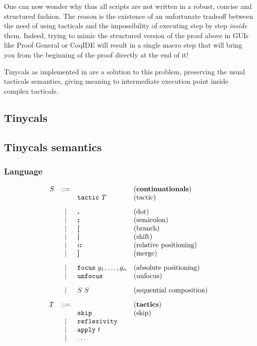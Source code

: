 
One can now wonder why thus all scripts are not written in a robust, concise and
structured fashion. The reason is the existence of an unfortunate tradeoff
between the need of using tacticals and the impossibility of executing step by
step \emph{inside} them. Indeed, trying to mimic the structured version of the
proof above in GUIs like Proof General or CoqIDE will result in a single macro
step that will bring you from the beginning of the proof directly at the end of
it!

Tinycals as implemented in \MATITA{} are a solution to this problem, preserving
the usual tacticals semantics, giving meaning to intermediate execution point
inside complex tacticals.

\subsection{Tinycals}

\subsection{Tinycals semantics}

\subsubsection{Language}

\[
\begin{array}{rcll}
 S & ::= & & \mbox{(\textbf{continuationals})}\\
   &     & \mathtt{tactic}~T & \mbox{(tactic)}\\[2ex]
   &  |  & \mbox{\textbf{.}} & \mbox{(dot)} \\
   &  |  & \mbox{\textbf{;}} & \mbox{(semicolon)} \\
   &  |  & \mbox{\textbf{[}} & \mbox{(branch)} \\
   &  |  & \mbox{\textbf{\textbar}} & \mbox{(shift)} \\
   &  |  & i\mbox{\textbf{:}} & \mbox{(relative positioning)} \\
   &  |  & \mbox{\textbf{]}} & \mbox{(merge)} \\[2ex]
   &  |  & \mathtt{focus}~g_1,\dots,g_n & \mbox{(absolute positioning)} \\
   &  |  & \mathtt{unfocus} & \mbox{(unfocus)} \\[2ex]
   &  |  & S ~ S & \mbox{(sequential composition)} \\[2ex]
   T & : := & & \mbox{(\textbf{tactics})}\\
     &   & \mathtt{skip} & \mbox{(skip)} \\
     & | & \mathtt{reflexivity} & \\
     & | & \mathtt{apply}~t & \\
     & | & \dots &
\end{array}
\]

